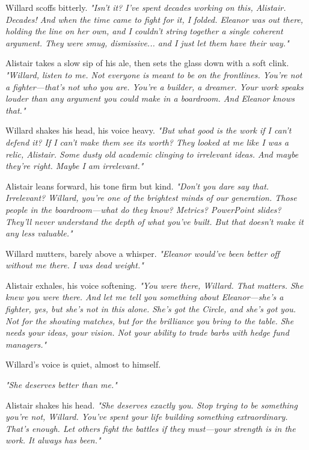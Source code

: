Willard scoffs bitterly.  
\textit{"Isn’t it? I’ve spent decades working on this, Alistair. Decades! And when the time came to fight for it, I folded. Eleanor was out there, holding the line on her own, and I couldn’t string together a single coherent argument. They were smug, dismissive... and I just let them have their way."}
\smallskip

Alistair takes a slow sip of his ale, then sets the glass down with a soft clink.  
\textit{"Willard, listen to me. Not everyone is meant to be on the frontlines. You’re not a fighter—that’s not who you are. You’re a builder, a dreamer. Your work speaks louder than any argument you could make in a boardroom. And Eleanor knows that."}
\smallskip

Willard shakes his head, his voice heavy.  
\textit{"But what good is the work if I can’t defend it? If I can’t make them see its worth? They looked at me like I was a relic, Alistair. Some dusty old academic clinging to irrelevant ideas. And maybe they’re right. Maybe I am irrelevant."}
\smallskip

Alistair leans forward, his tone firm but kind.  
\textit{"Don’t you dare say that. Irrelevant? Willard, you’re one of the brightest minds of our generation. Those people in the boardroom—what do they know? Metrics? PowerPoint slides? They’ll never understand the depth of what you’ve built. But that doesn’t make it any less valuable."}
\smallskip

Willard mutters, barely above a whisper.  
\textit{"Eleanor would’ve been better off without me there. I was dead weight."}
\smallskip

Alistair exhales, his voice softening.  
\textit{"You were there, Willard. That matters. She knew you were there. And let me tell you something about Eleanor—she’s a fighter, yes, but she’s not in this alone. She’s got the Circle, and she’s got you. Not for the shouting matches, but for the brilliance you bring to the table. She needs your ideas, your vision. Not your ability to trade barbs with hedge fund managers."}
\smallskip

Willard’s voice is quiet, almost to himself.  \smallskip

\textit{"She deserves better than me."}
\smallskip

Alistair shakes his head.  
\textit{"She deserves exactly you. Stop trying to be something you’re not, Willard. You’ve spent your life building something extraordinary. That’s enough. Let others fight the battles if they must—your strength is in the work. It always has been."}
\smallskip

